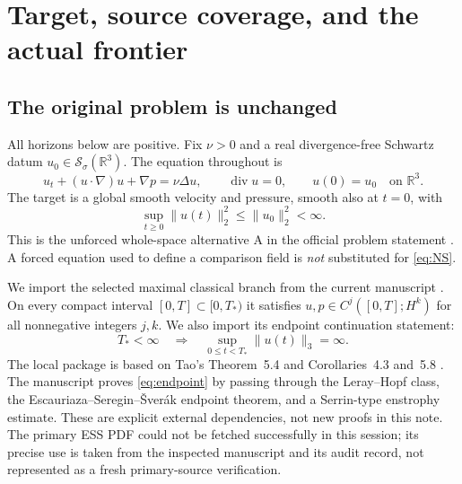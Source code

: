 \documentclass[11pt,a4paper]{article}
\theoremstyle{definition}\newtheorem{definition}[theorem]{Definition}
\theoremstyle{remark}\newtheorem{remark}[theorem]{Remark}
\newcommand{\R}{\mathbb R}
\newcommand{\norm}[1]{\lVert #1\rVert}
\newcommand{\diver}{\operatorname{div}}
\newcommand{\Sch}{\mathcal S_\sigma(\R^3)}
\numberwithin{equation}{section}
\begin{document}
\section{Target, source coverage, and the actual frontier}
\label{sec:scope}
\subsection{The original problem is unchanged}
All horizons below are positive. Fix $\nu>0$ and a real divergence-free Schwartz datum $u_0\in\Sch$. The equation throughout is
\begin{equation}\label{eq:NS}
 u_t+(u\cdot\nabla)u+\nabla p=\nu\Delta u,
 \qquad \diver u=0,\qquad u(0)=u_0
 \quad\text{on }\R^3.
\end{equation}
The target is a global smooth velocity and pressure, smooth also at $t=0$, with
\begin{equation}\label{eq:Clay}
 \sup_{t\ge0}\norm{u(t)}_2^2\le\norm{u_0}_2^2<\infty.
\end{equation}
This is the unforced whole-space alternative A in the official problem statement \cite{Clay}. A forced equation used to define a comparison field is \emph{not} substituted for \eqref{eq:NS}.

We import the selected maximal classical branch from the current manuscript \cite{Paper}. On every compact interval $[0,T]\subset[0,T_*)$ it satisfies $u,p\in C^j([0,T];H^k)$ for all nonnegative integers $j,k$. We also import its endpoint continuation statement:
\begin{equation}\label{eq:endpoint}
 T_*<\infty\quad\Longrightarrow\quad
 \sup_{0\le t<T_*}\norm{u(t)}_3=\infty.
\end{equation}
The local package is based on Tao's Theorem~5.4 and Corollaries~4.3 and~5.8 \cite{Tao}. The manuscript proves \eqref{eq:endpoint} by passing through the Leray--Hopf class, the Escauriaza--Seregin--\v Sver\'ak endpoint theorem, and a Serrin-type enstrophy estimate. These are explicit external dependencies, not new proofs in this note. The primary ESS PDF could not be fetched successfully in this session; its precise use is taken from the inspected manuscript and its audit record, not represented as a fresh primary-source verification.
\end{document}
